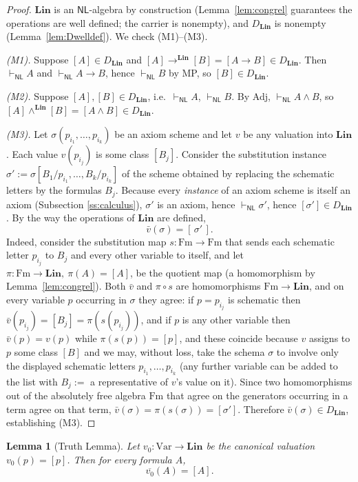 \documentclass[12pt]{article}
\newtheorem{lemma}{Lemma}
\theoremstyle{definition}
\newcommand{\NL}{\mathsf{NL}}
\newcommand{\prv}{\vdash_{\NL}}
\newcommand{\Fm}{\mathrm{Fm}}
\newcommand{\Var}{\mathrm{Var}}
\newcommand{\imp}{\rightarrow}
\newcommand{\Lin}{\mathbf{Lin}}
\begin{document}
\begin{proof}
$\Lin$ is an $\NL$-algebra by construction (Lemma~\ref{lem:congrel} guarantees
the operations are well defined; the carrier is nonempty), and $D_{\Lin}$ is
nonempty (Lemma~\ref{lem:Dwelldef}). We check (M1)--(M3).

\emph{(M1).} Suppose $[A]\in D_{\Lin}$ and $[A]\imp^{\Lin}[B]=[A\imp B]\in
D_{\Lin}$. Then $\prv A$ and $\prv A\imp B$, hence $\prv B$ by MP, so
$[B]\in D_{\Lin}$.

\emph{(M2).} Suppose $[A],[B]\in D_{\Lin}$, i.e.\ $\prv A$, $\prv B$. By Adj,
$\prv A\wedge B$, so $[A]\wedge^{\Lin}[B]=[A\wedge B]\in D_{\Lin}$.

\emph{(M3).} Let $\sigma(p_{i_{1}},\dots,p_{i_{k}})$ be an axiom scheme and let
$v$ be any valuation into $\Lin$. Each value $v(p_{i_{j}})$ is some class
$[B_{j}]$. Consider the substitution instance
$\sigma':=\sigma[B_{1}/p_{i_{1}},\dots,B_{k}/p_{i_{k}}]$ of the scheme obtained
by replacing the schematic letters by the formulas $B_{j}$. Because every
\emph{instance} of an axiom scheme is itself an axiom (Subsection
\ref{ss:calculus}), $\sigma'$ is an axiom, hence $\prv\sigma'$, hence
$[\sigma']\in D_{\Lin}$. By the way the operations of $\Lin$ are defined,
\[
\bar v(\sigma)=[\,\sigma'\,].
\]
Indeed, consider the substitution map $s\colon\Fm\to\Fm$ that sends each
schematic letter $p_{i_j}$ to $B_j$ and every other variable to itself, and let
$\pi\colon\Fm\to\Lin,\ \pi(A)=[A]$, be the quotient map (a homomorphism by
Lemma~\ref{lem:congrel}). Both $\bar v$ and $\pi\circ s$ are homomorphisms
$\Fm\to\Lin$, and on every variable $p$ occurring in $\sigma$ they agree:
if $p=p_{i_j}$ is schematic then $\bar v(p_{i_j})=[B_j]=\pi(s(p_{i_j}))$, and if
$p$ is any other variable then $\bar v(p)=v(p)$ while $\pi(s(p))=[p]$, and these
coincide because $v$ assigns to $p$ some class $[B]$ and we may, without loss,
take the schema $\sigma$ to involve only the displayed schematic letters
$p_{i_1},\dots,p_{i_k}$ (any further variable can be added to the list with
$B_j:=$ a representative of $v$'s value on it). Since two homomorphisms out of the
absolutely free algebra $\Fm$ that agree on the generators occurring in a term
agree on that term, $\bar v(\sigma)=\pi(s(\sigma))=[\sigma']$. Therefore
$\bar v(\sigma)\in D_{\Lin}$, establishing (M3).
\end{proof}

\begin{lemma}[Truth Lemma]\label{lem:truth}
Let $v_{0}\colon\Var\to\Lin$ be the canonical valuation $v_{0}(p)=[p]$. Then for
every formula $A$,
\[
\overline{v_{0}}(A)=[A].
\]
\end{lemma}
\end{document}
